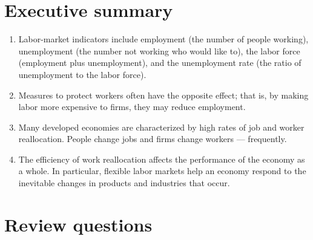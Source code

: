 \section*{Executive summary}

\setlength{\leftmargini}{.5\oldleftmargini}
\begin{enumerate}
\item Labor-market indicators include employment (the number of
people working), unemployment (the number not working who would
like to), the labor force (employment plus unemployment), and the
unemployment rate (the ratio of unemployment to the labor force).

\item Measures to protect workers often have the opposite effect; that is,
by making labor more expensive to firms, they may reduce employment.

\item Many developed economies are characterized by high rates of job
and worker reallocation. People change jobs and firms change
workers --- frequently.

\item The efficiency of work reallocation affects the performance
of the economy as a whole. In particular, flexible labor markets help an
economy respond to the inevitable changes in products and industries that occur.

\end{enumerate}
\setlength{\leftmargini}{\oldleftmargini}

\section*{Review questions}

